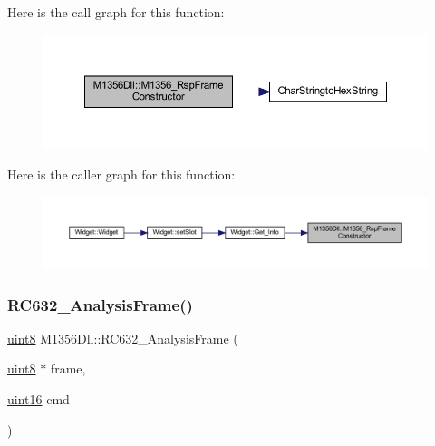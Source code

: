 Here is the call graph for this function\+:
\nopagebreak
\begin{figure}[H]
\begin{center}
\leavevmode
\includegraphics[width=350pt]{class_m1356_dll_a40131e8263bd201208a37ec1826d5310_cgraph}
\end{center}
\end{figure}
Here is the caller graph for this function\+:
\nopagebreak
\begin{figure}[H]
\begin{center}
\leavevmode
\includegraphics[width=350pt]{class_m1356_dll_a40131e8263bd201208a37ec1826d5310_icgraph}
\end{center}
\end{figure}
\mbox{\label{class_m1356_dll_a40aed3801baa294bf828c5ab794ef82e}} 
\subsubsection{\texorpdfstring{RC632\_AnalysisFrame()}{RC632\_AnalysisFrame()}\hspace{0.1cm}{\footnotesize\ttfamily [1/2]}}
{\footnotesize\ttfamily \mbox{\hyperlink{inc_2m1356dll_8h_adde6aaee8457bee49c2a92621fe22b79}{uint8}} M1356\+Dll\+::\+R\+C632\+\_\+\+Analysis\+Frame (\begin{DoxyParamCaption}\item[{\mbox{\hyperlink{inc_2m1356dll_8h_adde6aaee8457bee49c2a92621fe22b79}{uint8}} $\ast$}]{frame,  }\item[{\mbox{\hyperlink{inc_2m1356dll_8h_a05f6b0ae8f6a6e135b0e290c25fe0e4e}{uint16}}}]{cmd }\end{DoxyParamCaption})}

